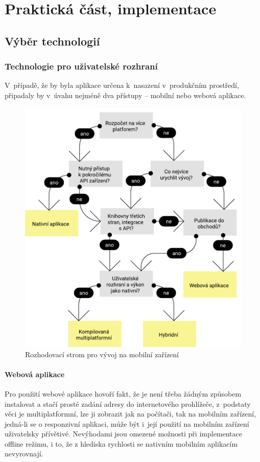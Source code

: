\documentclass[twoside]{ctuthesis}
\begin{document}
\newpage

\part{Praktická část, implementace}

\chapter{Výběr technologií}

\section{Technologie pro uživatelské rozhraní}

V~případě, že by byla aplikace určena k~nasazení v~produkčním prostředí, připadaly by v~úvahu nejméně dva přístupy -- mobilní nebo webová aplikace.

\begin{figure}[h!]
	\includegraphics[scale=0.7]{img/app-decision-tree.pdf}
	\caption{Rozhodovací strom pro vývoj na mobilní zařízení}
	\label{appdecisiontree}
\end{figure}

\subsection{Webová aplikace}
Pro použití webové aplikace hovoří fakt, že je není třeba žádným způsobem instalovat a stačí prosté zadání adresy do internetového prohlížeče, z~podstaty věci je multiplatformní, lze ji zobrazit jak na počítači, tak na mobilním zařízení, jedná-li se o responzivní aplikaci, může být i~její použití na mobilním zařízení uživatelsky přívětivé. Nevýhodami jsou omezené možnosti při implementace offline režimu, i to, že z hlediska rychlosti se nativním mobilním aplikacím nevyrovnají. \cite{stevens2018what}
\end{document}
